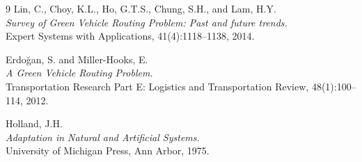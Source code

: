 \documentclass [a4paper, 11pt, titlepage] {article}
\begin{document}
\begin{thebibliography}{9}
Lin, C., Choy, K.L., Ho, G.T.S., Chung, S.H., and Lam, H.Y. \\
\emph{Survey of Green Vehicle Routing Problem: Past and future trends.} \\
Expert Systems with Applications, 41(4):1118--1138, 2014.

Erdoğan, S. and Miller-Hooks, E. \\
\emph{A Green Vehicle Routing Problem.} \\
Transportation Research Part E: Logistics and Transportation Review, 48(1):100--114, 2012.

Holland, J.H. \\
\emph{Adaptation in Natural and Artificial Systems.} \\
University of Michigan Press, Ann Arbor, 1975.

\end{thebibliography}
\end{document}
